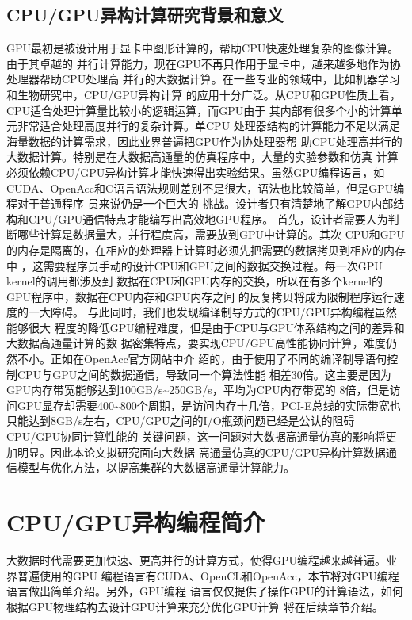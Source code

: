 \subsection{CPU/GPU异构计算研究背景和意义}
GPU最初是被设计用于显卡中图形计算的，帮助CPU快速处理复杂的图像计算。由于其卓越的
并行计算能力，现在GPU不再只作用于显卡中，越来越多地作为协处理器帮助CPU处理高
并行的大数据计算。在一些专业的领域中，比如机器学习和生物研究中，CPU/GPU异构计算
的应用十分广泛。从CPU和GPU性质上看，CPU适合处理计算量比较小的逻辑运算，而GPU由于
其内部有很多个小的计算单元非常适合处理高度并行的复杂计算。单CPU
处理器结构的计算能力不足以满足海量数据的计算需求，因此业界普遍把GPU作为协处理器帮
助CPU处理高并行的大数据计算。特别是在大数据高通量的仿真程序中，大量的实验参数和仿真
计算必须依赖CPU/GPU异构计算才能快速得出实验结果。虽然GPU编程语言，如
CUDA、OpenAcc和C语言语法规则差别不是很大，语法也比较简单，但是GPU编程对于普通程序
员来说仍是一个巨大的
挑战。设计者只有清楚地了解GPU内部结构和CPU/GPU通信特点才能编写出高效地GPU程序。
首先，设计者需要人为判断哪些计算是数据量大，并行程度高，需要放到GPU中计算的。其次
CPU和GPU的内存是隔离的，在相应的处理器上计算时必须先把需要的数据拷贝到相应的内存中
，这需要程序员手动的设计CPU和GPU之间的数据交换过程。每一次GPU kernel的调用都涉及到
数据在CPU和GPU内存的交换，所以在有多个kernel的GPU程序中，数据在CPU内存和GPU内存之间
的反复拷贝将成为限制程序运行速度的一大障碍。
与此同时，我们也发现编译制导方式的CPU/GPU异构编程虽然能够很大
程度的降低GPU编程难度，但是由于CPU与GPU体系结构之间的差异和大数据高通量计算的数
据密集特点，要实现CPU/GPU高性能协同计算，难度仍然不小。正如在OpenAcc官方网站中介
绍的，由于使用了不同的编译制导语句控制CPU与GPU之间的数据通信，导致同一个算法性能
相差30倍。这主要是因为GPU内存带宽能够达到100GB/s\~{}250GB/s，平均为CPU内存带宽的
8倍，但是访问GPU显存却需要400\~{}800个周期，是访问内存十几倍，PCI-E总线的实际带宽也
只能达到8GB/s左右，CPU/GPU之间的I/O瓶颈问题已经是公认的阻碍CPU/GPU协同计算性能的
关键问题，这一问题对大数据高通量仿真的影响将更加明显。因此本论文拟研究面向大数据
高通量仿真的CPU/GPU异构计算数据通信模型与优化方法，以提高集群的大数据高通量计算能力。

\section{CPU/GPU异构编程简介}
大数据时代需要更加快速、更高并行的计算方式，使得GPU编程越来越普遍。业界普遍使用的GPU
编程语言有CUDA、OpenCL和OpenAcc，本节将对GPU编程语言做出简单介绍。另外，GPU编程
语言仅仅提供了操作GPU的计算语法，如何根据GPU物理结构去设计GPU计算来充分优化GPU计算
将在后续章节介绍。

